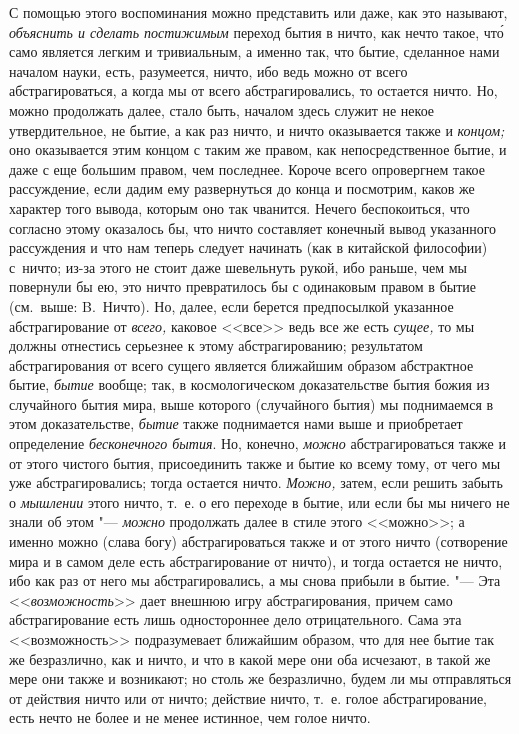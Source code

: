 С помощью этого воспоминания можно представить или даже, как это называют,
{\em объяснить и сделать постижимым} переход бытия в ничто, как нечто такое,
чт\'{о} само является легким и тривиальным, а именно так, что бытие, сделанное
нами началом науки, есть, разумеется, ничто, ибо ведь можно от всего
абстрагироваться, а когда мы от всего абстрагировались, то остается ничто. Но,
можно продолжать далее, стало быть, началом здесь служит не некое
утвердительное, не бытие, а как раз ничто, и ничто оказывается также и
{\em концом;} оно оказывается этим концом с таким же правом, как
непосредственное бытие, и даже с еще большим правом, чем последнее. Короче
всего опровергнем такое рассуждение, если дадим ему развернуться до конца и
посмотрим, каков же характер того вывода, которым оно так чванится. Нечего
беспокоиться, что согласно этому оказалось бы, что ничто составляет конечный
вывод указанного рассуждения и что нам теперь следует начинать (как в китайской
философии) с~ничто; из-за этого не стоит даже шевельнуть рукой, ибо раньше, чем
мы повернули бы ею, это ничто превратилось бы с одинаковым правом в бытие
(см.~выше: B.~Ничто). Но, далее, если берется предпосылкой указанное
абстрагирование от {\em всего,} каковое <<все>> ведь все же есть {\em сущее,}
то мы должны отнестись серьезнее к этому абстрагированию; результатом
абстрагирования от всего сущего является ближайшим образом абстрактное бытие,
{\em бытие} вообще; так, в космологическом доказательстве бытия божия из
случайного бытия мира, выше которого (случайного бытия) мы поднимаемся в этом
доказательстве, {\em бытие} также поднимается нами выше и приобретает
определение {\em бесконечного бытия}. Но, конечно, {\em можно} абстрагироваться
также и от этого чистого бытия, присоединить также и бытие ко всему тому, от
чего мы уже абстрагировались; тогда остается ничто. {\em Можно,} затем, если
решить забыть о {\em мышлении} этого ничто, т.~е. о его переходе в бытие, или
если бы мы ничего не знали об этом "--- {\em можно} продолжать далее в стиле
этого <<можно>>; а именно можно (слава богу) абстрагироваться также и от этого
ничто (сотворение мира и в самом деле есть абстрагирование от ничто), и тогда
остается не ничто, ибо как раз от него мы абстрагировались, а мы снова прибыли
в бытие. "--- Эта <<{\em возможность}>> дает внешнюю игру абстрагирования,
причем само абстрагирование есть лишь одностороннее дело отрицательного. Сама
эта <<возможность>> подразумевает ближайшим образом, что для нее бытие так же
безразлично, как и ничто, и что в какой мере они оба исчезают, в такой же мере
они также и возникают; но столь же безразлично, будем ли мы отправляться от
действия ничто или от ничто; действие ничто, т.~е. голое абстрагирование, есть
нечто не более и не менее истинное, чем голое ничто.


